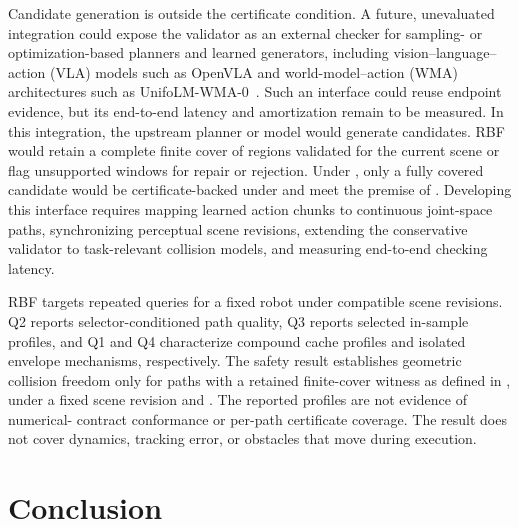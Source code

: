\documentclass[journal]{IEEEtran}
\newcommand{\rbf}{RBF}
\begin{document}
\begin{table}[!t]
\centering

\end{table}

Candidate generation is outside the certificate condition. A future, unevaluated
integration could expose the validator as an external checker for sampling- or
optimization-based planners and learned generators, including
vision--language--action (VLA) models such as OpenVLA and world-model--action
(WMA) architectures such as
\mbox{UnifoLM-WMA-0}~\cite{kim2024openvla,unitree2025unifolmwma}.
Such an interface could reuse endpoint evidence, but its end-to-end latency and
amortization remain to be measured. In this integration, the upstream planner or
model would generate candidates. \rbf{} would retain a complete finite cover of
regions validated for the current scene or flag unsupported windows for repair
or rejection. Under , only a fully covered candidate
would be certificate-backed under  and meet the premise
of . Developing this interface requires
mapping learned action chunks to continuous joint-space paths,
synchronizing perceptual scene revisions, extending the conservative validator
to task-relevant collision models, and measuring end-to-end checking latency.

\rbf{} targets repeated queries for a fixed robot under compatible scene
revisions. Q2 reports selector-conditioned path quality, Q3 reports selected
in-sample profiles, and Q1 and Q4 characterize compound cache profiles and
isolated envelope mechanisms, respectively. The safety result establishes
geometric collision freedom only for paths with a retained finite-cover witness
as defined in , under a fixed scene revision and
. The reported profiles are not evidence of numerical-
contract conformance or per-path certificate coverage. The result does not cover
dynamics, tracking error, or obstacles that move during execution.

\section{Conclusion}\label{sec:conclusion}
\end{document}
